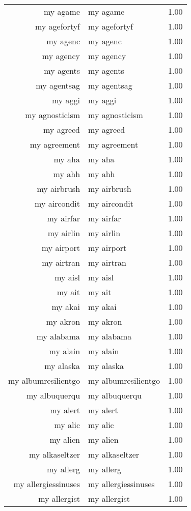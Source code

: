 \begin{table}[ht]
\begin{tabular}{rlr}
  my agame & my agame & 1.00 \\ 
  my agefortyf & my agefortyf & 1.00 \\ 
  my agenc & my agenc & 1.00 \\ 
  my agency & my agency & 1.00 \\ 
  my agents & my agents & 1.00 \\ 
  my agentsag & my agentsag & 1.00 \\ 
  my aggi & my aggi & 1.00 \\ 
  my agnosticism & my agnosticism & 1.00 \\ 
  my agreed & my agreed & 1.00 \\ 
  my agreement & my agreement & 1.00 \\ 
  my aha & my aha & 1.00 \\ 
  my ahh & my ahh & 1.00 \\ 
  my airbrush & my airbrush & 1.00 \\ 
  my aircondit & my aircondit & 1.00 \\ 
  my airfar & my airfar & 1.00 \\ 
  my airlin & my airlin & 1.00 \\ 
  my airport & my airport & 1.00 \\ 
  my airtran & my airtran & 1.00 \\ 
  my aisl & my aisl & 1.00 \\ 
  my ait & my ait & 1.00 \\ 
  my akai & my akai & 1.00 \\ 
  my akron & my akron & 1.00 \\ 
  my alabama & my alabama & 1.00 \\ 
  my alain & my alain & 1.00 \\ 
  my alaska & my alaska & 1.00 \\ 
  my albumresilientgo & my albumresilientgo & 1.00 \\ 
  my albuquerqu & my albuquerqu & 1.00 \\ 
  my alert & my alert & 1.00 \\ 
  my alic & my alic & 1.00 \\ 
  my alien & my alien & 1.00 \\ 
  my alkaseltzer & my alkaseltzer & 1.00 \\ 
  my allerg & my allerg & 1.00 \\ 
  my allergiessinuses & my allergiessinuses & 1.00 \\ 
  my allergist & my allergist & 1.00 \\ 

\end{tabular}
\end{table}
